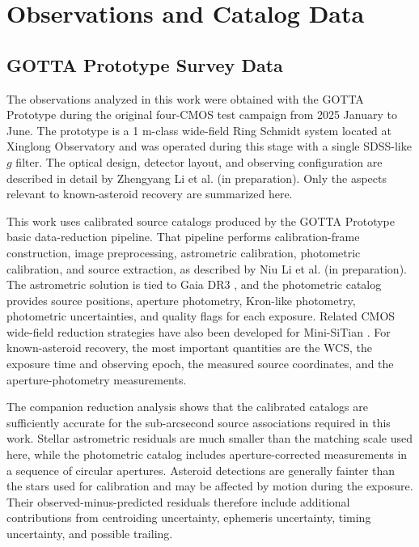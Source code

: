 \documentclass[referee]{raa}
\begin{document}
\section{Observations and Catalog Data}
\label{sec:data}

\subsection{GOTTA Prototype Survey Data}

The observations analyzed in this work were obtained with the GOTTA Prototype during the original four-CMOS test campaign from 2025 January to June. The prototype is a 1 m-class wide-field Ring Schmidt system located at Xinglong Observatory and was operated during this stage with a single SDSS-like $g$ filter. The optical design, detector layout, and observing configuration are described in detail by Zhengyang Li et al. (in preparation). Only the aspects relevant to known-asteroid recovery are summarized here.

This work uses calibrated source catalogs produced by the GOTTA Prototype basic data-reduction pipeline. That pipeline performs calibration-frame construction, image preprocessing, astrometric calibration, photometric calibration, and source extraction, as described by Niu Li et al. (in preparation). The astrometric solution is tied to Gaia DR3 \citep{Gaia2023}, and the photometric catalog provides source positions, aperture photometry, Kron-like photometry, photometric uncertainties, and quality flags for each exposure. Related CMOS wide-field reduction strategies have also been developed for Mini-SiTian \citep{Xiao2025}. For known-asteroid recovery, the most important quantities are the WCS, the exposure time and observing epoch, the measured source coordinates, and the aperture-photometry measurements.

The companion reduction analysis shows that the calibrated catalogs are sufficiently accurate for the sub-arcsecond source associations required in this work. Stellar astrometric residuals are much smaller than the matching scale used here, while the photometric catalog includes aperture-corrected measurements in a sequence of circular apertures. Asteroid detections are generally fainter than the stars used for calibration and may be affected by motion during the exposure. Their observed-minus-predicted residuals therefore include additional contributions from centroiding uncertainty, ephemeris uncertainty, timing uncertainty, and possible trailing.
\end{document}

